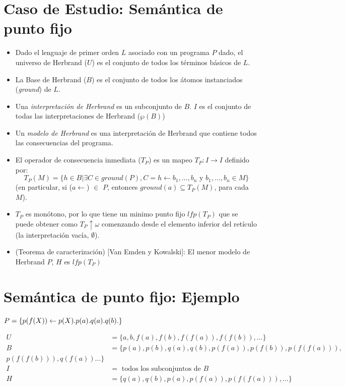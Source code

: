 \documentclass[11pt]{article}
\begin{document}
\section*{Caso de Estudio: Semántica de punto fijo}
\label{sec:orgf473be6}
\begin{itemize}
\item Dado el lenguaje de primer orden \(L\) asociado con un programa \(P\)
dado, el universo de Herbrand (\(U\)) es el conjunto de todos los
términos básicos de \(L\).
\item La Base de Herbrand (\(B\)) es el conjunto de todos los átomos
instanciados (\emph{ground}) de \(L\).
\item Una \emph{interpretación de Herbrand} es un subconjunto de \(B\). \(I\) es el
conjunto de todas las interpretaciones de Herbrand (\(\wp(B)\))
\item Un \emph{modelo de Herbrand} es una interpretación de Herbrand que contiene
todos las consecuencias del programa.
\item El operador de consecuencia inmediata (\(T_P\)) es un mapeo \(T_P : I
  \rightarrow I\) definido por: $$T_P(M) = \{h \in B \vert \exists C
  \in ground(P), C = h \leftarrow b_1, \ldots, b_n \mbox{ y } b_1, \ldots,
  b_n \in M\}$$ (en particular, si (\(a \leftarrow\)) \(\in\) \(P\), entonces \(ground(a) \subseteq T_P(M)\), para cada \(M\)).
\item \(T_P\) es monótono, por lo que tiene un minimo punto fijo \(lfp(T_P)\)
que se puede obtener como \(T_P \uparrow \omega\) comenzando desde el
elemento inferior del retículo (la interpretación vacía, \(\emptyset\)).
\item (Teorema de caracterización) [Van Emden y Kowalski]: El menor modelo de Herbrand \(P\), \(H\) es \(lfp(T_P)\)
\end{itemize}

\section*{Semántica de punto fijo: Ejemplo}
\label{sec:org7398bf9}

\(P = \{ p(f(X)) \leftarrow p(X). \\
        p(a). q(a). q(b). \}\)

\begin{align}
U &= \{ a,b,f(a),f(b),f(f(a)),f(f(b)),\ldots \} \\

B &= \{ p(a),p(b),q(a),q(b),p(f(a)),p(f(b)),p(f(f(a))), \\ 
     p(f(f(b))), q(f(a))\ldots  \} \\

I &= \mbox{ todos los subconjuntos de } B \\

H &= \{ q(a), q(b), p(a), p(f(a)), p(f(f(a))), \ldots \} \\
\end{align}      
\end{document}
